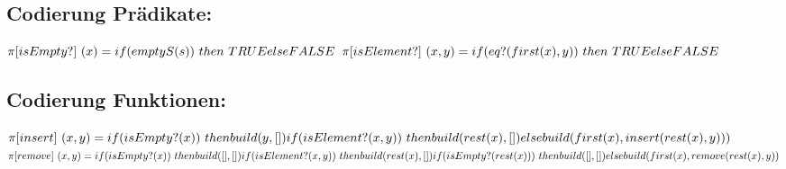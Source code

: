 \documentclass[12pt,runningheads,a4paper]{llncs}
\begin{document}
\subsection*{Codierung Prädikate:}
$\pi[isEmpty?] \ (x) = \\
if(emptyS(s)) \ then \ TRUE\\
else\\
FALSE\\
$
$
\\ \pi[isElement?] \ (x,y) = \\
if(eq?(first(x), y)) \ then \ TRUE\\
else\\
FALSE\\
$
\subsection*{Codierung Funktionen:}
$
\pi[insert] \ (x,y) = \\
if(isEmpty?(x)) \ then \\
build(y, []) \\
if(isElement?(x,y)) \ then \\
build(rest(x), []) \\
else \\
build(first(x), insert(rest(x), y)))\\
$
$
\\ \pi[remove] \ (x,y) = \\
if(isEmpty?(x)) \ then \\
build([],[]) \\
if(isElement?(x,y)) \ then \\
build(rest(x), []) \\
if(isEmpty?(rest(x))) \ then \\
build([], []) \\
else\\
build(first(x), remove(rest(x), y))
$
\end{document}

